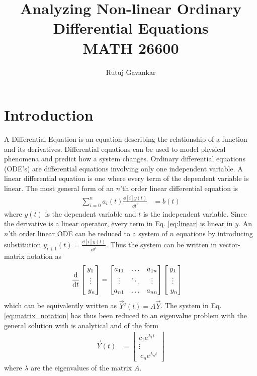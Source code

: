 \documentclass[12pt,1in]{article}
\title{Analyzing Non-linear Ordinary Differential Equations\\ {\small MATH 26600}}
\author{Rutuj Gavankar}
\date{}
\begin{document}
\maketitle

\section{Introduction}
A Differential Equation is an equation describing the relationship of a function and its derivatives. Differential equations can be used to model physical phenomena and predict how a system changes. Ordinary differential equations (ODE's) are differential equations involving only one independent variable. A linear differential equation is one where every term of the dependent  variable is linear. The most general form of an $n$'th order linear differential equation is 
\begin{align}
\sum_{i = 0}^{n} a_i(t) \frac{\dd[i]{y(t)}}{\dd{t^i}} &= b(t) \label{eq:linear}
\end{align}
where $y(t)$ is the dependent variable and $t$ is the independent variable. Since the derivative is a linear operator, every term in Eq. \ref{eq:linear} is linear in $y$. An $n$'th order linear ODE can be reduced to a system of $n$ equations by introducing substitution $y_{i+1}(t) = \frac{\dd[i]{y(t)}}{\dd{t^i}}$. Thus the system can be written in vector-matrix notation as 
\begin{align}
\derivative{}{t} \begin{bmatrix}
y_1 \\ \vdots  \\\ y_n 
\end{bmatrix}  &= 
\begin{bmatrix}
a_{11} & \ldots & a_{1n} \\
\vdots & \ddots & \vdots \\
a_{n1} & \ldots & a_{nn}
\end{bmatrix}
\begin{bmatrix}
y_1 \\ \vdots  \\\ y_n \label{eq:matrix_notation}
\end{bmatrix}
\end{align}
which can be equivalently written as $\vec{Y}'(t) = A \vec{Y}$. The system in Eq. \ref{eq:matrix_notation} has thus been reduced to an eigenvalue problem with the general solution with is analytical and of the form 
\begin{align}
\vec{Y}(t) &= \begin{bmatrix}
c_1 e^{\lambda_1 t} \\ \vdots  \\\ c_n e^{\lambda_n t}  \label{eq:general_sol}
\end{bmatrix}
\end{align}
where $\lambda$ are the eigenvalues of the matrix $A$. 
\end{document}
